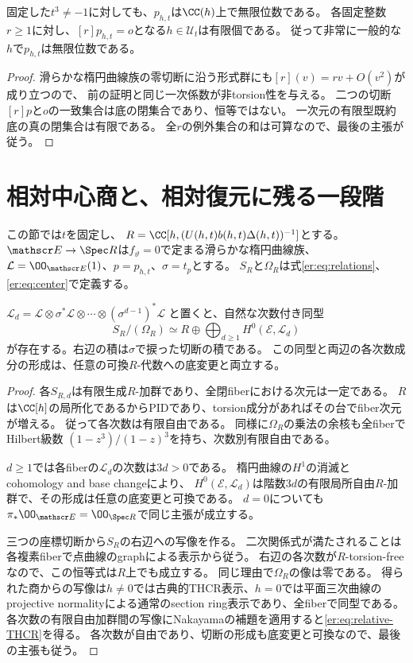 \begin{corollary}[固定したHesse係数でのgenericな位数]\label{er:cor:nontorsion}
固定した$t^3\ne-1$に対しても、$p_{h,t}$は$\CC(h)$上で無限位数である。
各固定整数$r\ge1$に対し、$[r]p_{h,t}=o$となる$h\in\mathscr U_t$は有限個である。
従って非常に一般的な$h$で$p_{h,t}$は無限位数である。
\end{corollary}
\begin{proof}
滑らかな楕円曲線族の零切断に沿う形式群にも$[r](v)=rv+O(v^2)$が成り立つので、
前の証明と同じ一次係数が非torsion性を与える。
二つの切断$[r]p$と$o$の一致集合は底の閉集合であり、恒等ではない。
一次元の有限型既約底の真の閉集合は有限である。
全$r$の例外集合の和は可算なので、最後の主張が従う。
\end{proof}

\section{相対中心商と、相対復元に残る一段階}\label{er:sec:relative}
この節では$t$を固定し、
$R=\CC[h,(U(h,t)b(h,t)\Delta(h,t))^{-1}]$とする。
$\mathscr E\to\Spec R$は$f_{\vartheta}=0$で定まる滑らかな楕円曲線族、
$\mathcal L=\OO_{\mathscr E}(1)$、$p=p_{h,t}$、$\sigma=t_p$とする。
$S_R$と$\Omega_R$は式\eqref{er:eq:relations}、\eqref{er:eq:center}で定義する。

\begin{proposition}[中心商の相対THCR表示]\label{er:prop:relative-THCR}
$\mathcal L_d=\mathcal L\otimes\sigma^*\mathcal L\otimes\cdots\otimes(\sigma^{d-1})^*\mathcal L$
と置くと、自然な次数付き同型
\begin{equation}\label{er:eq:relative-THCR}
 S_R/(\Omega_R)\simeq
 R\oplus\bigoplus_{d\ge1}H^0(\mathscr E,\mathcal L_d)
\end{equation}
が存在する。右辺の積は$\sigma$で捩った切断の積である。
この同型と両辺の各次数成分の形成は、任意の可換$R$-代数への底変更と両立する。
\end{proposition}
\begin{proof}
各$S_{R,d}$は有限生成$R$-加群であり、全閉fiberにおける次元は一定である。
$R$は$\CC[h]$の局所化であるからPIDであり、torsion成分があればその台でfiber次元が増える。
従って各次数は有限自由である。
同様に$\Omega_R$の乗法の余核も全fiberでHilbert級数
$(1-z^3)/(1-z)^3$を持ち、次数別有限自由である。

$d\ge1$では各fiberの$\mathcal L_d$の次数は$3d>0$である。
楕円曲線の$H^1$の消滅とcohomology and base changeにより、
$H^0(\mathscr E,\mathcal L_d)$は階数$3d$の有限局所自由$R$-加群で、その形成は任意の底変更と可換である。
$d=0$についても$\pi_*\OO_{\mathscr E}=\OO_{\Spec R}$で同じ主張が成立する。

三つの座標切断から$S_R$の右辺への写像を作る。
二次関係式が満たされることは各複素fiberで点曲線のgraphによる表示から従う。
右辺の各次数が$R$-torsion-freeなので、この恒等式は$R$上でも成立する。
同じ理由で$\Omega_R$の像は零である。
得られた商からの写像は$h\ne0$では古典的THCR表示、$h=0$では平面三次曲線の
projective normalityによる通常のsection ring表示であり、全fiberで同型である。
各次数の有限自由加群間の写像にNakayamaの補題を適用すると\eqref{er:eq:relative-THCR}を得る。
各次数が自由であり、切断の形成も底変更と可換なので、最後の主張も従う。
\end{proof}

